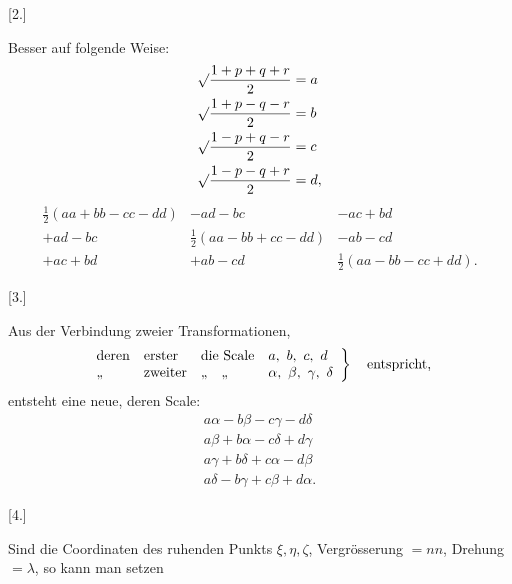 \begin{center}[2.]\end{center}

Besser auf folgende Weise:
\[
\begin{aligned}
\mathord{\surd}\frac{1+p+q+r}{2}&=a\\
\mathord{\surd}\frac{1+p-q-r}{2}&=b\\
\mathord{\surd}\frac{1-p+q-r}{2}&=c\\
\mathord{\surd}\frac{1-p-q+r}{2}&=d,
\end{aligned}
\]
\[
\begin{array}{ccc}
\tfrac12(aa+bb-cc-dd)&-ad-bc&-ac+bd\\
+ad-bc&\tfrac12(aa-bb+cc-dd)&-ab-cd\\
+ac+bd&+ab-cd&\tfrac12(aa-bb-cc+dd).
\end{array}
\]

\begin{center}[3.]\end{center}

Aus der Verbindung zweier Transformationen,
\[
\left.\begin{array}{llll}
\text{deren}&\text{erster}&\text{die Scale}&a,\ b,\ c,\ d\\
\text{,,}&\text{zweiter}&\text{,,\quad,,}&\alpha,\ \beta,\ \gamma,\ \delta
\end{array}\right\}\quad\text{entspricht,}
\]
entsteht eine neue, deren Scale:
\[
\begin{gathered}
a\alpha-b\beta-c\gamma-d\delta\\
a\beta+b\alpha-c\delta+d\gamma\\
a\gamma+b\delta+c\alpha-d\beta\\
a\delta-b\gamma+c\beta+d\alpha.
\end{gathered}
\]

\begin{center}[4.]\end{center}

Sind die Coordinaten des ruhenden Punkts $\xi,\eta,\zeta$, Vergrösserung $=nn$, Drehung $=\lambda$, so kann man setzen
